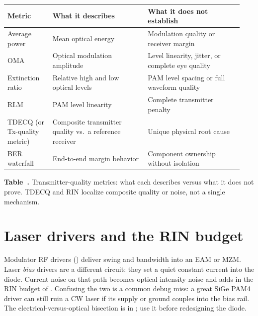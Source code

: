 \begin{table}[ht]
\label{tab:tx-quality-metrics}%
\centering
\setlength{\tabcolsep}{3pt}%
\footnotesize
\renewcommand{\arraystretch}{1.25}%
\begin{tabular}{@{}p{0.18\linewidth}p{0.38\linewidth}p{0.38\linewidth}@{}}
\toprule
Metric & What it describes & What it does not establish \\
\midrule
Average power & Mean optical energy & Modulation quality or receiver margin \\
\addlinespace[1.25em]
OMA & Optical modulation amplitude & Level linearity, jitter, or complete eye quality \\
\addlinespace[1.25em]
Extinction ratio & Relative high and low optical levels & PAM level spacing or full waveform quality \\
\addlinespace[1.25em]
RLM & PAM level linearity & Complete transmitter penalty \\
\addlinespace[1.25em]
TDECQ (or Tx-quality metric) & Composite transmitter quality vs.\ a reference receiver & Unique physical root cause \\
\addlinespace[1.25em]
BER waterfall & End-to-end margin behavior & Component ownership without isolation \\
\bottomrule
\end{tabular}
\par\medskip
{\raggedright\footnotesize\textbf{Table~\thetable.} Transmitter-quality metrics:
what each describes versus what it does not prove. TDECQ and RIN localize
composite quality or noise, not a single mechanism.\par}
\end{table}

\section{Laser drivers and the RIN budget}
\label{sec:laser-drivers}

Modulator RF drivers () deliver swing and bandwidth into an EAM
or MZM. Laser \emph{bias} drivers are a different circuit: they set a quiet
constant current into the diode. Current noise on that path becomes optical
intensity noise and adds in the RIN budget of . Confusing the two
is a common debug miss: a great SiGe PAM4 driver can still ruin a CW laser if its
supply or ground couples into the bias rail. The electrical-versus-optical
bisection is in ; use it before redesigning the diode.

